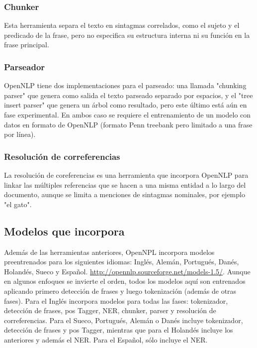 \subsubsection{Chunker}
 Esta herramienta separa el texto en sintagmas correlados, como el sujeto y el predicado de la frase, pero no especifica su estructura interna ni su función en la frase principal. 
\subsubsection{Parseador}
 OpenNLP tiene dos implementaciones para el parseado: una llamada "chunking parser" que genera como salida el texto parseado separado por espacios, y el "tree insert parser" que genera un árbol como resultado, pero este último está aún en fase experimental. En ambos caso se requiere el entrenamiento de un modelo con datos en formato de OpenNLP (formato Penn treebank pero limitado a una frase por línea).
\subsubsection{Resolución de correferencias}
La resolución de coreferencias es una herramienta que incorpora OpenNLP para linkar las múltiples referencias que se hacen a una misma entidad a lo largo del documento, aunque se limita a menciones de sintagmas nominales, por ejemplo \textsf{"el gato"}. 
\subsection{Modelos que incorpora}
Además de las herramientas anteriores, OpenNPL incorpora modelos preentrenados para los siguientes idiomas: Inglés, Alemán, Portugués, Danés, Holandés, Sueco y Español. \url{http://opennlp.sourceforge.net/models-1.5/}. Aunque en algunos enfoques se invierte el orden, todos los modelos aquí son entrenados aplicando primero detección de frases y luego tokenización (además de otras fases). \newline
Para el Inglés incorpora modelos para todas las fases: tokenizador, detección de frases, pos Tagger, NER, chunker, parser y resolución de correferencias. Para el Sueco, Portugués, Alemán o Danés incluye tokenizador, detección de frases y pos Tagger, mientras que para el Holandés incluye los anteriores y además el NER. Para el Español, sólo incluye el NER.

